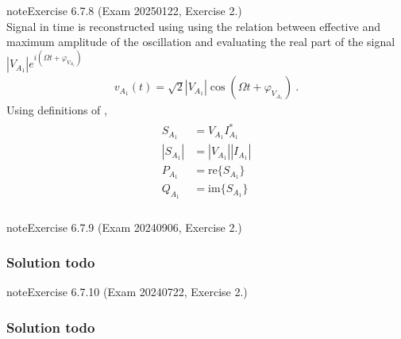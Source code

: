 \documentclass[letterpaper,10pt,english]{jupyterBook}
\begin{document}
\begin{sphinxadmonition}{note}{Exercise 6.7.8 (Exam 2025\sphinxhyphen{}01\sphinxhyphen{}22, Exercise 2.)}
\begin{equation*}
\end{equation*}
\sphinxAtStartPar
Signal in time is reconstructed using using the relation between effective and maximum amplitude of the oscillation and evaluating the real part of the signal \(|V_{A_1}| e^{i(\Omega t + \varphi_{V_{A_1}})}\)
\begin{equation*}
\begin{split}v_{A_1}(t) = \sqrt{2} |V_{A_1}| \cos(\Omega t + \varphi_{V_{A_1}}) \ .\end{split}
\end{equation*}
\sphinxAtStartPar
{} Using definitions of {\hyperref[\detokenize{ch/electrical-engineering-networks-harmonic:classical-electromagnetism-electrical-engineering-newtork-analysis-harmonic-power}]{}},
\begin{equation*}
\begin{split}\begin{aligned}
   S_{A_1}  & = V_{A_1} I_{A_1}^* \\
  |S_{A_1}| & = |V_{A_1}| |I_{A_1}| \\
   P_{A_1}  & = \text{re} \{ S_{A_1} \} \\
   Q_{A_1}  & = \text{im} \{ S_{A_1} \} \\
\end{aligned}\end{split}
\end{equation*}\end{sphinxadmonition}
 \label{exercise:exam-24-09-06-exe-02}

\begin{sphinxadmonition}{note}{Exercise 6.7.9 (Exam 2024\sphinxhyphen{}09\sphinxhyphen{}06, Exercise 2.)}



\begin{figure}[htbp]
\centering

\noindent{}
\end{figure}
\subsubsection*{Solution \sphinxhyphen{} todo}
\end{sphinxadmonition}
 \label{exercise:exam-24-07-22-exe-02}

\begin{sphinxadmonition}{note}{Exercise 6.7.10 (Exam 2024\sphinxhyphen{}07\sphinxhyphen{}22, Exercise 2.)}



\begin{figure}[htbp]
\centering

\noindent{}
\end{figure}
\subsubsection*{Solution \sphinxhyphen{} todo}
\end{sphinxadmonition}
\end{document}
